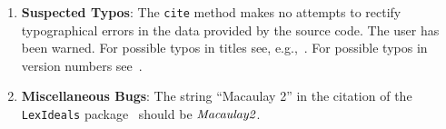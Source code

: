 \documentclass[11pt]{article}
\begin{document}
\begin{enumerate}
	\item \textbf{Suspected Typos}: The \texttt{cite} method makes no attempts to rectify typographical errors in the data provided by the source code. The user has been warned. For possible typos in titles see, e.g.,~\cite{BrunsSource,HigherCIOperatorsSource,MarkovSource}. For possible typos in version numbers see~\cite{DivisorSource}.

	\item \textbf{Miscellaneous Bugs}: The string ``Macaulay 2'' in the citation of the \texttt{LexIdeals} package~\cite{LexIdealsSource} should be $\emph{Macaulay2}$.
\end{enumerate}


\nocite{*}
{}

\end{document}
